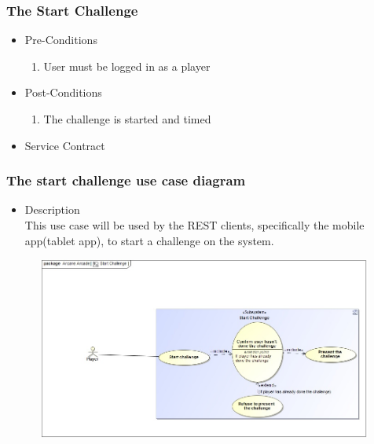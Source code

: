 \documentclass[english]{article}
\begin{document}
		\subsubsection{The Start Challenge}
		
			\begin{itemize}
	
		
		\item Pre-Conditions
			\begin{enumerate}
				
				\item User must be logged in as a player
			\end{enumerate}
		\item Post-Conditions 
			\begin{enumerate}
			\item The challenge is started and timed
						
			\end{enumerate}
		\item Service Contract
			\begin{figure}
			
			\end{figure}

		\end{itemize}
		
		
		\subsubsection* {The start challenge use case diagram}
		\begin{itemize}
			\item Description\\
			This use case will be used by the REST clients, specifically the mobile app(tablet app), to start a challenge on the system.
		\end{itemize}
		
	
		\includegraphics[width=14cm,height=6cm,keepaspectratio]{startChallenge.jpg}
		
\end{document}
